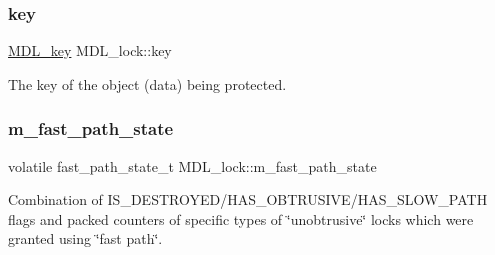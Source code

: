 \subsubsection{\texorpdfstring{key}{key}}
{\footnotesize\ttfamily \mbox{\hyperlink{structMDL__key}{M\+D\+L\+\_\+key}} M\+D\+L\+\_\+lock\+::key}

The key of the object (data) being protected. \mbox{\label{classMDL__lock_ae680877b7079a862d294ccbefed6372c}} 
\subsubsection{\texorpdfstring{m\+\_\+fast\+\_\+path\+\_\+state}{m\_fast\_path\_state}}
{\footnotesize\ttfamily volatile fast\+\_\+path\+\_\+state\+\_\+t M\+D\+L\+\_\+lock\+::m\+\_\+fast\+\_\+path\+\_\+state}

Combination of I\+S\+\_\+\+D\+E\+S\+T\+R\+O\+Y\+E\+D/\+H\+A\+S\+\_\+\+O\+B\+T\+R\+U\+S\+I\+V\+E/\+H\+A\+S\+\_\+\+S\+L\+O\+W\+\_\+\+P\+A\+TH flags and packed counters of specific types of \char`\"{}unobtrusive\char`\"{} locks which were granted using \char`\"{}fast path\char`\"{}.

